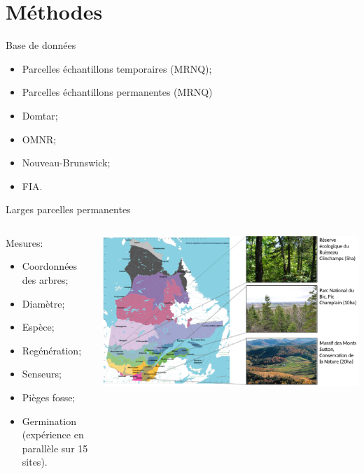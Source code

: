 \documentclass{eecslides}
\begin{document}
\section{Méthodes}
	\begin{frame}{Base de données}
		\begin{itemize}
			\item Parcelles échantillons temporaires (MRNQ);
			\item Parcelles échantillons permanentes (MRNQ)
			\item Domtar;
			\item OMNR;
			\item Nouveau-Brunswick;
			\item FIA.
		\end{itemize}
	\end{frame}


	\begin{frame}{Larges parcelles permanentes}
		\begin{columns}
			\begin{column}{0.35\textwidth}
			Mesures:
				\begin{itemize}
					\item Coordonnées des arbres;
					\item Diamètre;
					\item Espèce;			
					\item Regénération;
					\item Senseurs;
					\item Pièges fosse;
					\item Germination (expérience en parallèle sur 15 sites).
				\end{itemize}
			\end{column}	
			\begin{column}{0.65\textwidth}
				\begin{center}
					\includegraphics[height=0.5\textheight]{carte_parcelles}
				\end{center}
			\end{column}
		\end{columns}	    	
	\end{frame}
\end{document}
